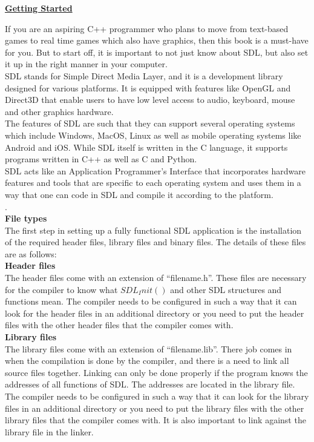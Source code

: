 \documentclass{article}
\begin{document}
	\textbf{\underline{Getting Started}}
	\begin{flushleft}
		If you are an aspiring C++ programmer who plans to move from text-based games to real time games which also have graphics, then this book is a must-have for you. But to start off, it is important to not just know about SDL, but also set it up in the right manner in your computer. \\
		
		SDL stands for Simple Direct Media Layer, and it is a development library designed for various platforms. It is equipped with features like OpenGL and Direct3D that enable users to have low level access to audio, keyboard, mouse and other graphics hardware. \\
		
		The features of SDL are such that they can support several operating systems which include Windows, MacOS, Linux as well as mobile operating systems like Android and iOS. While SDL itself is written in the C language, it supports programs written in C++ as well as C and Python. \\
		
		SDL acts like an Application Programmer’s Interface that incorporates hardware features and tools that are specific to each operating system and uses them in a way that one can code in SDL and compile it according to the platform. \\.\\
		
		\textbf{File types}\\
		
		The first step in setting up a fully functional SDL application is the installation of the required header files, library files and binary files. The details of these files are as follows:\\
		
	\textbf{Header files}\\
	
		The header files come with an extension of “filename.h”. These files are necessary for the compiler to know what $ SDL_Init() $ and other SDL structures and functions mean. The compiler needs to be configured in such a way that it can look for the header files in an additional directory or you need to put the header files with the other header files that the compiler comes with. \\
		\textbf{Library files} \\
		
		The library files come with an extension of “filename.lib”. There job comes in when the compilation is done by the compiler, and there is a need to link all source files together. Linking can only be done properly if the program knows the addresses of all functions of SDL. The addresses are located in the library file. The compiler needs to be configured in such a way that it can look for the library files in an additional directory or you need to put the library files with the other library files that the compiler comes with. It is also important to link against the library file in the linker.  \\
		

\end{flushleft}
\end{document}

